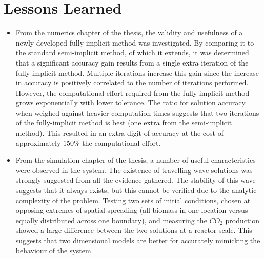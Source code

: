 \section{Lessons Learned}

\begin{itemize}
  \item From the numerics chapter of the thesis, the validity and usefulness of a newly developed fully-implicit method was investigated.
    By comparing it to the standard semi-implicit method, of which it extends, it was determined that a significant accuracy gain results from a single extra iteration of the fully-implicit method.
    Multiple iterations increase this gain since the increase in accuracy is positively correlated to the number of iterations performed.
    However, the computational effort required from the fully-implicit method grows exponentially with lower tolerance.
    The ratio for solution accuracy when weighed against heavier computation times suggests that two iterations of the fully-implicit method is best (one extra from the semi-implicit method).
    This resulted in an extra digit of accuracy at the cost of approximately $150\%$ the computational effort.
  \item From the simulation chapter of the thesis, a number of useful characteristics were observed in the system.
    The existence of travelling wave solutions was strongly suggested from all the evidence gathered.
    The stability of this wave suggests that it always exists, but this cannot be verified due to the analytic complexity of the problem.
    Testing two sets of initial conditions, chosen at opposing extremes of spatial spreading (all biomass in one location versus equally distributed across one boundary), and measuring the $CO_2$ production showed a large difference between the two solutions at a reactor-scale.
    This suggests that two dimensional models are better for accurately mimicking the behaviour of the system.
\end{itemize}
